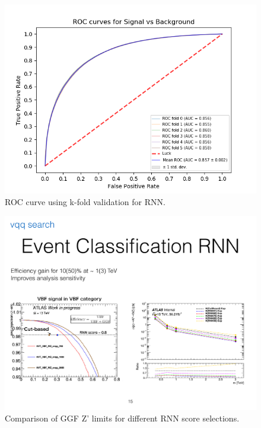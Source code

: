 \begin{figure}[h!]
  \centering
  \includegraphics[width=\hsize]{figures/Analysis/kFold_ROC.png}
  \caption{ROC curve using k-fold validation for RNN.} 
  \label{fig:rnn_roc}
\end{figure}
\FloatBarrier



\begin{figure}[h!]
  \centering
  \includegraphics[width=\hsize]{figures/Analysis/rnn_limits.pdf}
  \caption{Comparison of GGF Z' limits for different RNN score selections.} 
  \label{fig:rnn_limits}
\end{figure}
\FloatBarrier


